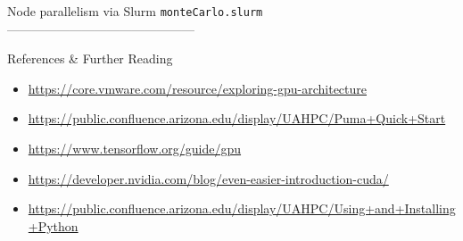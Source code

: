 \documentclass[dvipsnames,pdf,9pt]{beamer}
\newcommand{\<}{\langle}
\renewcommand{\>}{\rangle}
\begin{document}
\begin{frame}[fragile]{Node parallelism via Slurm}
  \tiny{
    \verb+monteCarlo.slurm+\\
    ---------------------------------------------
    }
\end{frame}

\begin{frame}{References \& Further Reading}
  \begin{small}
  \begin{itemize}
  \item \href{https://core.vmware.com/resource/exploring-gpu-architecture}{https://core.vmware.com/resource/exploring-gpu-architecture}
  \item \href{https://public.confluence.arizona.edu/display/UAHPC/Puma+Quick+Start}{https://public.confluence.arizona.edu/display/UAHPC/Puma+Quick+Start}
  \item \href{https://www.tensorflow.org/guide/gpu}{https://www.tensorflow.org/guide/gpu}
  \item \href{https://developer.nvidia.com/blog/even-easier-introduction-cuda/}{https://developer.nvidia.com/blog/even-easier-introduction-cuda/}
  \item \href{https://public.confluence.arizona.edu/display/UAHPC/Using+and+Installing+Python}{https://public.confluence.arizona.edu/display/UAHPC/Using+and+Installing+Python}
    
  \end{itemize}
  \end{small}
\end{frame}
\end{document}
